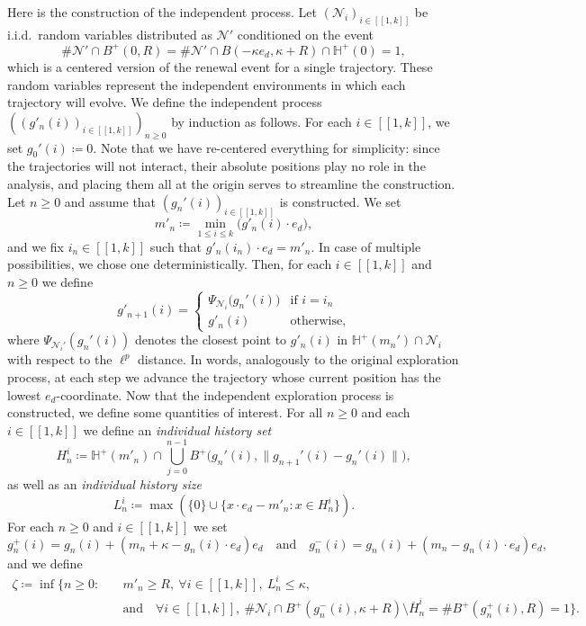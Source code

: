 \documentclass[a4paper, 11pt]{article}
\theoremstyle{plain}
\theoremstyle{definition}
\newcommand{\range}[2]{[\![#1,#2]\!]}
\numberwithin{equation}{section}
\begin{document}
Here is the construction of the independent process. Let $(\mathcal N_i)_{i\in\range{1}{k}}$ be i.i.d.\ random variables distributed as $\mathcal N'$ conditioned on the event
    \[\#\mathcal N'\cap B^+(0,R)=\#\mathcal N'\cap B(-\kappa e_d,\kappa+R)\cap\mathbb H^+(0)=1,\]
which is a centered version of the renewal event for a single trajectory. These random variables represent the independent environments in which each trajectory will evolve. We define the independent process $((g'_n(i))_{i\in\range{1}{k}})_{n\geq 0}$ by induction as follows. For each $i\in\range{1}{k}$, we set  $g_0'(i)\coloneqq 0$. Note that we have re-centered everything for simplicity: since the trajectories will not interact, their absolute positions play no role in the analysis, and placing them all at the origin serves to streamline the construction. Let $n\geq0$ and assume that $(g_n'(i))_{i\in\range{1}{k}}$ is constructed. We set
    \[m'_n\coloneqq\min_{1\leq i\leq k}\big(g'_n(i)\cdot e_d\big),\]
and we fix $i_n\in\range{1}{k}$ such that $g'_n(i_n)\cdot e_d=m'_n$. In case of multiple possibilities, we chose one deterministically. Then, for each $i\in\range{1}{k}$ and $n\geq0$ we define
    \[g'_{n+1}(i)=\begin{cases}
        \Psi_{\mathcal N_i}\big(g_n'(i)\big) & \text{if $i=i_n$}\\
        g'_n(i) & \text{otherwise,}
    \end{cases}\]
where $\Psi_{\mathcal N_i'}(g_n'(i))$ denotes the closest point to $g'_n(i)$ in $\mathbb H^+(m_n')\cap\mathcal N_i$ with respect to the $\ell^p$ distance. In words, analogously to the original exploration process, at each step we advance the trajectory whose current position has the lowest $e_d$-coordinate. Now that the independent exploration process is constructed, we define some quantities of interest. For all $n\geq 0$ and each $i\in\range{1}{k}$ we define an \emph{individual history set}
    \[H_n^i\coloneqq\mathbb H^+(m'_n)\cap\bigcup_{j=0}^{n-1}B^+\big(g_n'(i), \|g_{n+1}'(i)-g_n'(i)\|\big),\]
as well as an \emph{individual history size}
    \[L_n^i\coloneqq\max(\{0\}\cup\{x\cdot e_d-m'_n:x\in H_n^i\}).\]
For each $n\geq 0$ and $i\in\range{1}{k}$ we set
    \[g_n^+(i)=g_n(i)+(m_n+\kappa-g_n(i)\cdot e_d)e_d\quad\text{and}\quad g_n^-(i)=g_n(i)+(m_n-g_n(i)\cdot e_d)e_d,\]
and we define
    \begin{equation*}
        \begin{split}
            \zeta\coloneqq\inf\{n\geq 0:\quad &m'_n\geq R,~\forall i\in\range{1}{k},~L_n^i\leq\kappa,\\
            &\text{and}\quad\forall i\in\range{1}{k},~\#\mathcal N_i\cap B^+(g_n^-(i), \kappa+R)\setminus \overline {H}_n^i=\#B^+(g_n^+(i), R)=1\}.
        \end{split}
    \end{equation*}
\end{document}
